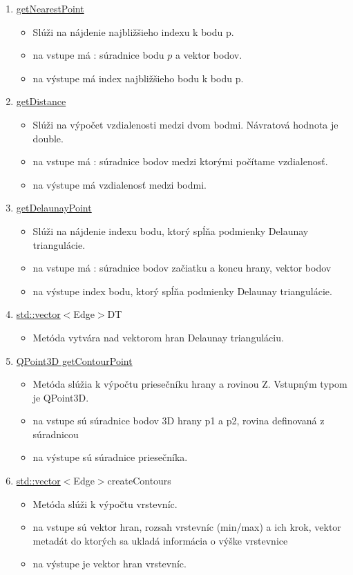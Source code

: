 \documentclass[12pt]{article}
\begin{document}
\begin{enumerate}
\item[] \underline{getNearestPoint}
\begin{itemize}
\item Slúži na nájdenie najbližšieho indexu k bodu p. 
\item na vstupe má : súradnice bodu  $p$  a vektor bodov.
\item na výstupe má index najbližšieho bodu k bodu p.
\end{itemize}

\item[] \underline{getDistance}
\begin{itemize}
\item Slúži na výpočet vzdialenosti medzi dvom bodmi. Návratová hodnota je double. 
\item na vstupe má : súradnice bodov medzi ktorými počítame vzdialenosť.
\item na výstupe má vzdialenosť medzi bodmi.
\end{itemize}

\item[] \underline{getDelaunayPoint}
\begin{itemize}
\item Slúži na nájdenie indexu bodu, ktorý spĺňa podmienky Delaunay triangulácie. 
\item na vstupe má : súradnice bodov začiatku a koncu hrany, vektor bodov
\item na výstupe index bodu, ktorý spĺňa podmienky Delaunay triangulácie.
\end{itemize}

\item[] \underline {std::vector}$<${Edge}$>${DT}
\begin{itemize}
\item Metóda vytvára nad vektorom hran Delaunay trianguláciu.
\end{itemize}

\item[] \underline{QPoint3D getContourPoint}
\begin{itemize}
\item Metóda slúžia k výpočtu priesečníku hrany a rovinou Z. Vstupným typom je QPoint3D.
\item na vstupe sú súradnice bodov 3D hrany p1 a p2, rovina definovaná z súradnicou 
\item na výstupe sú súradnice priesečníka.
\end{itemize}

\item[] \underline {std::vector}$<${Edge}$>${createContours}
\begin{itemize}
\item Metóda slúži k výpočtu vrstevníc.
\item na vstupe sú vektor hran, rozsah vrstevníc (min/max) a ich krok, vektor metadát do ktorých sa ukladá informácia o výške vrstevnice
\item na výstupe je vektor hran vrstevníc.
\end{itemize}


\end{enumerate}
\end{document}
